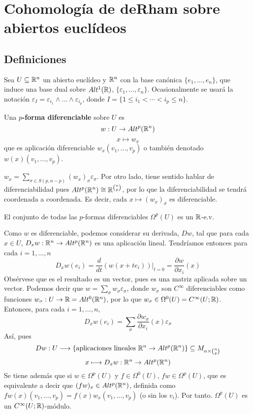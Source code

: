 \documentclass[CV.tex]{subfiles}
\begin{document}

\chapter{Cohomología de deRham sobre abiertos euclídeos}
\section{Definiciones}
Sea $U\subseteq\mathbb{R}^n$ un abierto euclídeo y $\mathbb{R}^n$ con la base canónica $\{e_1,\dots, e_n\}$, que induce una base dual sobre $Alt^1(\mathbb{R})$, $\{\varepsilon_1,\dots, \varepsilon_n\}$. Ocasionalmente se usará la notación $\varepsilon_I=\varepsilon_{i_1}\land\dots\land\varepsilon_{i_p}$, donde $I=\{1\leq i_1<\cdots<i_p\leq n\}$.

\begin{defi}
Una \textbf{$p$-forma diferenciable} sobre $U$ es 
\[
w:U\to Alt^p(\mathbb{R}^n)
\]
\[
x\mapsto w_x
\]
que es aplicación diferenciable $w_x(v_1,\dots, v_p)$ o también denotado $w(x)(v_1,\dots, v_p)$. 
\end{defi}

\begin{observaciones}
$w_x=\sum_{\sigma\in S(p,n-p)}(w_x)_{\sigma}\varepsilon_{\sigma}$. Por otro lado, tiene sentido hablar de diferenciabilidad pues $Alt^p(\mathbb{R}^n)\cong \mathbb{R}^{\binom{n}{p}}$, por lo que la diferenciabilidad se tendrá coordenada a coordenada. Es decir, cada $x\mapsto (w_x)_{\sigma}$ es diferenciable. 
\end{observaciones}

\begin{lemma}
El conjunto de todas las $p$-formas diferenciables $\Omega^p(U)$ es un $\mathbb{R}$-e.v.
\end{lemma}

Como $w$ es diferenciable, podemos considerar su derivada, $Dw$, tal que para cada $x\in U$, $D_xw:\mathbb{R}^n\to Alt^p(\mathbb{R}^n)$ es una aplicación lineal. Tendríamos entonces para cada $i=1,\dots, n$
\[
D_xw(e_i)=\frac{d}{dt}(w(x+te_i))|_{t=0}=\frac{\partial w}{\partial x_i}(x)
\]
Obsérvese que es el resultado es un vector, pues es una matriz aplicada sobre un vector. Podemos decir que $w=\sum_{\sigma}w_{\sigma}\varepsilon_{\sigma}$, donde $w_{\sigma}$ son $C^{\infty}$ diferenciables como funciones $w_{\sigma}: U\to \mathbb{R}=Alt^0(\mathbb{R}^n)$, por lo que $w_{\sigma}\in\Omega^0(U)=C^{\infty}(U;\mathbb{R})$. Entonces, para cada $i=1,\dots, n$,
\[
D_xw(e_i)=\sum_{\sigma}\frac{\partial w_{\sigma}}{\partial x_i}(x)\varepsilon_{\sigma}
\]
\newpage
Así, pues
\[
Dw: U\longrightarrow \{\text{aplicaciones lineales } \mathbb{R}^n\to Alt^p(\mathbb{R}^n)\}\subseteq M_{n\times\binom{n}{p}}
\]
\[x\longmapsto D_xw:\mathbb{R}^n\to Alt^p(\mathbb{R}^n)
\]
Se tiene además que si $w\in\Omega^p(U)$ y $f\in\Omega^0(U)$, $fw\in\Omega^p(U)$, que es equivalente a decir que $(fw)_x\in Alt^p(\mathbb{R}^n)$, definida como $fw(x)(v_1,\dots, v_p)=f(x)w_x(v_1,\dots, v_p)$ (o sin los $v_i$). Por tanto. $\Omega^p(U)$ es un $C^{\infty}(U;\mathbb{R})$-módulo. 
\end{document}
